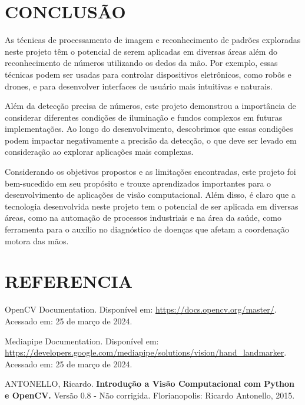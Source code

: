 \documentclass[12pt,a4paper]{article}
\begin{document}
        \newpage
        
    
    \section*{CONCLUSÃO}
    \thispagestyle{myheadings}
    \markright{ }

        As técnicas de processamento de imagem e reconhecimento de padrões exploradas neste projeto têm o potencial de serem aplicadas em diversas áreas além do reconhecimento de números utilizando os dedos da mão. Por exemplo, essas técnicas podem ser usadas para controlar dispositivos eletrônicos, como robôs e drones, e para desenvolver interfaces de usuário mais intuitivas e naturais.

        Além da detecção precisa de números, este projeto demonstrou a importância de considerar diferentes condições de iluminação e fundos complexos em futuras implementações. Ao longo do desenvolvimento, descobrimos que essas condições podem impactar negativamente a precisão da detecção, o que deve ser levado em consideração ao explorar aplicações mais complexas.

        Considerando os objetivos propostos e as limitações encontradas, este projeto foi bem-sucedido em seu propósito e trouxe aprendizados importantes para o desenvolvimento de aplicações de visão computacional. Além disso, é claro que a tecnologia desenvolvida neste projeto tem o potencial de ser aplicada em diversas áreas, como na automação de processos industriais e na área da saúde, como ferramenta para o auxílio no diagnóstico de doenças que afetam a coordenação motora das mãos.

    \section*{REFERENCIA}

        \noindent OpenCV Documentation. Disponível em: \url{https://docs.opencv.org/master/}. Acessado em: 25 de março de 2024.
        
        \noindent Mediapipe Documentation. Disponível em: \url{https://developers.google.com/mediapipe/solutions/vision/hand_landmarker}. Acessado em: 25 de março de 2024.

        \noindent ANTONELLO, Ricardo. \textbf{Introdução a Visão Computacional com Python e OpenCV.} Versão 0.8 - Não corrigida. Florianopolis: Ricardo Antonello, 2015.

        
\end{document}
